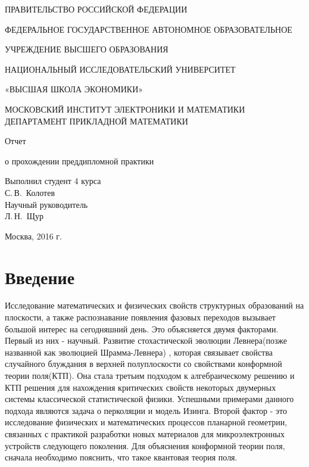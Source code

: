 \documentclass[a4paper]{article}
\begin{document}
	
	\begin{titlepage}
		\begin{center}
			\large
			ПРАВИТЕЛЬСТВО РОССИЙСКОЙ ФЕДЕРАЦИИ
			
			ФЕДЕРАЛЬНОЕ ГОСУДАРСТВЕННОЕ АВТОНОМНОЕ ОБРАЗОВАТЕЛЬНОЕ 
			
			УЧРЕЖДЕНИЕ ВЫСШЕГО ОБРАЗОВАНИЯ
			
			НАЦИОНАЛЬНЫЙ ИССЛЕДОВАТЕЛЬСКИЙ УНИВЕРСИТЕТ
			
			«ВЫСШАЯ ШКОЛА ЭКОНОМИКИ»\\[12pt]
			\vspace{0.25cm}
			
			МОСКОВСКИЙ ИНСТИТУТ ЭЛЕКТРОНИКИ И МАТЕМАТИКИ
			ДЕПАРТАМЕНТ ПРИКЛАДНОЙ МАТЕМАТИКИ
			
			\vspace{2cm}
			
			{\large Отчет 
				
				о прохождении преддипломной практики}
			\bigskip
		\end{center}
		\vfill
		
		\hfill\begin{minipage}{0.35\textwidth}
			Выполнил студент 4 курса\\
			С.\,В.~Колотев\\
			
			
			Научный руководитель\\
			Л.\,Н.~Щур\\
		\end{minipage}%
		\bigskip
		\vfill
		
		
		\begin{center}
			Москва, 2016 г.
		\end{center}
	\end{titlepage}
	
	\renewcommand\contentsname{Оглавление}
	\section{Введение}
	
	\par Исследование математических и физических свойств структурных образований на плоскости, а также распознавание появления фазовых переходов вызывает большой интерес на сегодняшний день. Это объясняется двумя факторами. Первый из них - научный. Развитие стохастической эволюции Левнера(позже названной как эволюцией Шрамма-Левнера) \cite{shram}, которая связывает свойства случайного блуждания в верхней полуплоскости со свойствами конформной теории поля(КТП)\cite{cft}. Она стала третьим подходом к алгебраическому решению\cite{stat_model} и КТП\cite{conf_algeb} решения для нахождения критических свойств некоторых двумерных системы классической статистической физики. Успешными примерами данного подхода являются задача о перколяции\cite{harm_expl,crit_perc} и модель Изинга\cite{conf_inv}. Второй фактор - это исследование физических и математических процессов планарной геометрии, связанных с практикой разработки новых материалов для микроэлектронных устройств следующего поколения\cite{microvawe}. Для объяснения конформной теории поля, сначала необходимо пояснить, что такое квантовая теория поля. 
	
\end{document}
